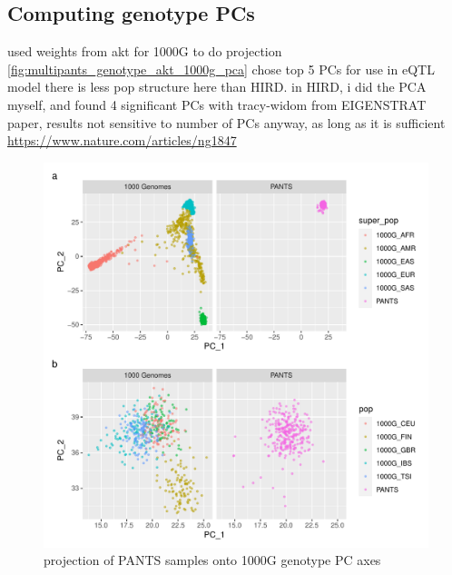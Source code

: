 \begin{outline}
\subsection{Computing genotype PCs}

\1 used weights from akt for 1000G to do projection \autoref{fig:multipants_genotype_akt_1000g_pca}
\1 chose top 5 PCs for use in eQTL model
    \2 there is less pop structure here than HIRD. in HIRD, i did the PCA myself, and found 4 significant PCs with tracy-widom
    \2 from EIGENSTRAT paper, results not sensitive to number of PCs anyway, as long as it is sufficient \url{https://www.nature.com/articles/ng1847}

\begin{figure}
    \centering
    \includegraphics[width=1.0\textwidth,page=1]{mainmatter/figures/chapter_04/pants_samples.sampleids_cleaned_to_lowercase.filtered.GRCh38.sorted.multiPANTS.projection_1000G_pca.pdf}
    \caption{projection of PANTS samples onto 1000G genotype PC axes}
    \label{fig:multipants_genotype_akt_1000g_pca}
\end{figure}


\end{outline}
